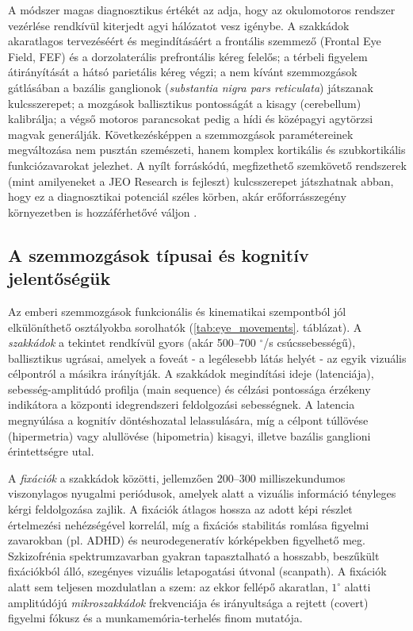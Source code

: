 \documentclass[12pt,a4paper,oneside]{book}
\begin{document}
A módszer magas diagnosztikus értékét az adja, hogy az okulomotoros rendszer vezérlése rendkívül kiterjedt agyi hálózatot vesz igénybe. A szakkádok akaratlagos tervezéséért és megindításáért a frontális szemmező (Frontal Eye Field, FEF) és a dorzolaterális prefrontális kéreg felelős; a térbeli figyelem átirányítását a hátsó parietális kéreg végzi; a nem kívánt szemmozgások gátlásában a bazális ganglionok (\emph{substantia nigra pars reticulata}) játszanak kulcsszerepet; a mozgások ballisztikus pontosságát a kisagy (cerebellum) kalibrálja; a végső motoros parancsokat pedig a hídi és középagyi agytörzsi magvak generálják. Következésképpen a szemmozgások paramétereinek megváltozása nem pusztán szemészeti, hanem komplex kortikális és szubkortikális funkciózavarokat jelezhet. A nyílt forráskódú, megfizethető szemkövető rendszerek (mint amilyeneket a JEO Research is fejleszt) kulcsszerepet játszhatnak abban, hogy ez a diagnosztikai potenciál széles körben, akár erőforrásszegény környezetben is hozzáférhetővé váljon \cite{orlosky_jeo}.

\subsection{A szemmozgások típusai és kognitív jelentőségük}

Az emberi szemmozgások funkcionális és kinematikai szempontból jól elkülöníthető osztályokba sorolhatók (\ref{tab:eye_movements}. táblázat). A \emph{szakkádok} a tekintet rendkívül gyors (akár 500--700 $^\circ$/s csúcssebességű), ballisztikus ugrásai, amelyek a foveát - a legélesebb látás helyét - az egyik vizuális célpontról a másikra irányítják. A szakkádok megindítási ideje (latenciája), sebesség-amplitúdó profilja (main sequence) és célzási pontossága érzékeny indikátora a központi idegrendszeri feldolgozási sebességnek. A latencia megnyúlása a kognitív döntéshozatal lelassulására, míg a célpont túllövése (hipermetria) vagy alullövése (hipometria) kisagyi, illetve bazális ganglioni érintettségre utal.

A \emph{fixációk} a szakkádok közötti, jellemzően 200--300 milliszekundumos viszonylagos nyugalmi periódusok, amelyek alatt a vizuális információ tényleges kérgi feldolgozása zajlik. A fixációk átlagos hossza az adott képi részlet értelmezési nehézségével korrelál, míg a fixációs stabilitás romlása figyelmi zavarokban (pl. ADHD) és neurodegeneratív kórképekben figyelhető meg. Szkizofrénia spektrumzavarban gyakran tapasztalható a hosszabb, beszűkült fixációkból álló, szegényes vizuális letapogatási útvonal (scanpath). A fixációk alatt sem teljesen mozdulatlan a szem: az ekkor fellépő akaratlan, $1^\circ$ alatti amplitúdójú \emph{mikroszakkádok} frekvenciája és irányultsága a rejtett (covert) figyelmi fókusz és a munkamemória-terhelés finom mutatója.
\end{document}
